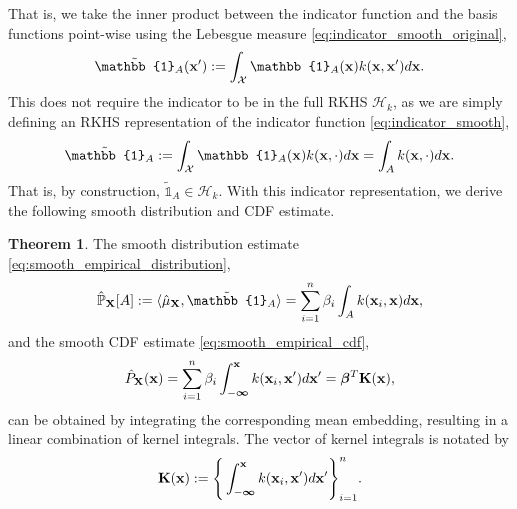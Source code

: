 \documentclass[twoside]{article} \usepackage{aistats2017}
\theoremstyle{definition}
\theoremstyle{theorem}
\newtheorem{theorem}{Theorem}[section]
\newcommand{\rv}[1]{{#1}}
\newcommand{\inner}[2]{{\langle #1, #2 \rangle}}
\begin{document}
		That is, we take the inner product between the indicator function and the basis functions point-wise using the Lebesgue measure \eqref{eq:indicator_smooth_original},
		\begin{equation}
			\tilde{\mathbb{1}}_{A}(\bvec{x}') := \int_{\mathcal{X}} \mathbb{1}_{A}(\bvec{x}) k(\bvec{x}, \bvec{x}') d\bvec{x}.
		\label{eq:indicator_smooth_original}
		\end{equation}
		This does not require the indicator to be in the full RKHS $\mathcal{H}_{k}$, as we are simply defining an RKHS representation of the indicator function \eqref{eq:indicator_smooth},
		\begin{equation}
			\tilde{\mathbb{1}}_{A} := \int_{\mathcal{X}} \mathbb{1}_{A}(\bvec{x}) k(\bvec{x}, \cdot) d\bvec{x} = \int_{A} k(\bvec{x}, \cdot) d\bvec{x}.
		\label{eq:indicator_smooth}
		\end{equation}
		That is, by construction, $\tilde{\mathbb{1}}_{A} \in \mathcal{H}_{k}$. With this indicator representation, we derive the following smooth distribution and CDF estimate.
		\begin{theorem} \label{thm:smooth_empirical_distribution_and_cdf}
			The smooth distribution estimate \eqref{eq:smooth_empirical_distribution},
			\begin{equation}
				\hat{\mathbb{P}}_{\bvec{\rv{X}}}[A] := \inner{\hat{\mu}_{\bvec{\rv{X}}}}{\tilde{\mathbb{1}}_{A}} = \sum_{i = 1}^{n} \beta_{i} \int_{A}  k(\bvec{x}_{i}, \bvec{x}) d\bvec{x},
			\label{eq:smooth_empirical_distribution}
			\end{equation}
			and the smooth CDF estimate \eqref{eq:smooth_empirical_cdf},
			\begin{equation}
				\hat{P}_{\bvec{\rv{X}}}(\bvec{x}) = \sum_{i = 1}^{n} \beta_{i} \int_{-\bm{\infty}}^{\bvec{x}}  k(\bvec{x}_{i}, \bvec{x}') d\bvec{x}' = \bm{\beta}^{T} \bvec{K}(\bvec{x}),
			\label{eq:smooth_empirical_cdf}
			\end{equation}
			can be obtained by integrating the corresponding mean embedding, resulting in a linear combination of kernel integrals. The vector of kernel integrals is notated by
			\begin{equation}
				\mathbf{K}(\mathbf{x}) := \Bigg\{ \int_{-\bm{\infty}}^{\mathbf{x}}  k(\mathbf{x}_{i}, \mathbf{x}') d\mathbf{x}' \Bigg\}_{i = 1}^{n}.
			\label{eq:kernel_integral}
			\end{equation}
		\end{theorem}
			
\end{document}
